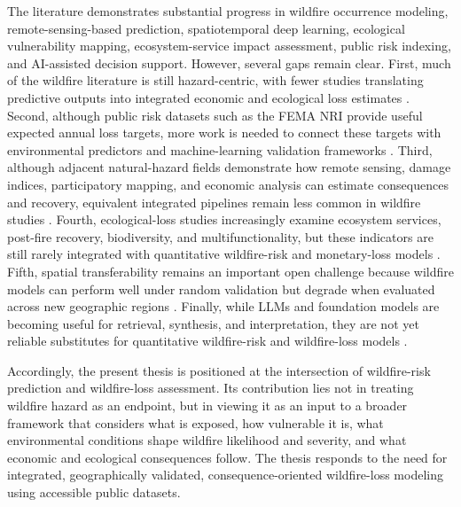 The literature demonstrates substantial progress in wildfire occurrence modeling, remote-sensing-based prediction, spatiotemporal deep learning, ecological vulnerability mapping, ecosystem-service impact assessment, public risk indexing, and AI-assisted decision support. However, several gaps remain clear. First, much of the wildfire literature is still hazard-centric, with fewer studies translating predictive outputs into integrated economic and ecological loss estimates \citep{asif2026supranational,caron2025ai}. Second, although public risk datasets such as the FEMA NRI provide useful expected annual loss targets, more work is needed to connect these targets with environmental predictors and machine-learning validation frameworks \citep{fema2025nri_technical,fema2025nri_methodology}. Third, although adjacent natural-hazard fields demonstrate how remote sensing, damage indices, participatory mapping, and economic analysis can estimate consequences and recovery, equivalent integrated pipelines remain less common in wildfire studies \citep{lateef2025floodedcrop,dang2024cropflood,shi2021cropyield,zhu2025ogallala}. Fourth, ecological-loss studies increasingly examine ecosystem services, post-fire recovery, biodiversity, and multifunctionality, but these indicators are still rarely integrated with quantitative wildfire-risk and monetary-loss models \citep{rocesdiaz2022ecosystemservices,perezcabello2021postfire,roche2024postfire,laterza2026multifunctionality}. Fifth, spatial transferability remains an important open challenge because wildfire models can perform well under random validation but degrade when evaluated across new geographic regions \citep{roberts2017crossvalidation,valavi2019blockcv,meyer2021aoa,wang2023spatialplus}. Finally, while LLMs and foundation models are becoming useful for retrieval, synthesis, and interpretation, they are not yet reliable substitutes for quantitative wildfire-risk and wildfire-loss models \citep{xie2025rag,ramesh2025assessingwildfiregpt,cheng2026retrieval}.

Accordingly, the present thesis is positioned at the intersection of wildfire-risk prediction and wildfire-loss assessment. Its contribution lies not in treating wildfire hazard as an endpoint, but in viewing it as an input to a broader framework that considers what is exposed, how vulnerable it is, what environmental conditions shape wildfire likelihood and severity, and what economic and ecological consequences follow. The thesis responds to the need for integrated, geographically validated, consequence-oriented wildfire-loss modeling using accessible public datasets.
